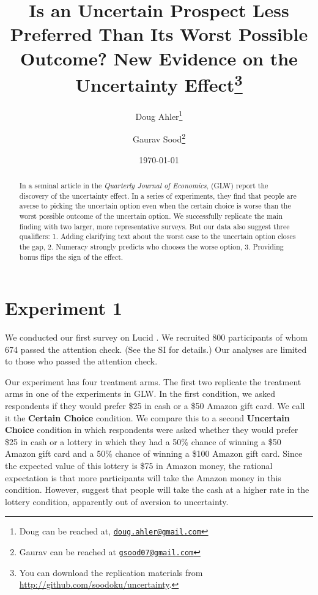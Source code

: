 \documentclass[12pt, letterpaper]{article}
\title{Is an Uncertain Prospect Less Preferred Than Its Worst Possible Outcome? New Evidence on the Uncertainty Effect\thanks{You can download the replication materials from \href{http://github.com/soodoku/uncertainty}{http://github.com/soodoku/uncertainty}.}}
\author{Doug Ahler\thanks{Doug can be reached at, \href{mailto:doug.ahler@gmail.com}{\footnotesize{\texttt{doug.ahler@gmail.com}}}} \and Gaurav Sood\thanks{Gaurav can be reached at \href{mailto:gsood07@gmail.com}{\footnotesize{\texttt{gsood07@gmail.com}}}}}
\date{\today}
\begin{document}
\maketitle

\thispagestyle{empty}
\begin{abstract}
\noindent In a seminal article in the \textit{Quarterly Journal of Economics}, \cite{gneezy2006uncertainty} (GLW) report the discovery of the uncertainty effect. In a series of experiments, they find that people are averse to picking the uncertain option even when the certain choice is worse than the worst possible outcome of the uncertain option. We successfully replicate the main finding with two larger, more representative surveys. But our data also suggest three qualifiers: 1. Adding clarifying text about the worst case to the uncertain option closes the gap, 2. Numeracy strongly predicts who chooses the worse option, 3. Providing bonus flips the sign of the effect.
\end{abstract} 
\clearpage
\setcounter{page}{1}
\doublespace

\section*{Experiment 1}

We conducted our first survey on Lucid \citep{coppock2019validating}. We recruited 800 participants of whom 674 passed the attention check. (See the SI for details.) Our analyses are limited to those who passed the attention check.

Our experiment has four treatment arms. The first two replicate the treatment arms in one of the experiments in GLW. In the first condition, we asked respondents if they would prefer \$25 in cash or a \$50 Amazon gift card. We call it the \textbf{Certain Choice} condition. We compare this to a second \textbf{Uncertain Choice} condition in which respondents were asked whether they would prefer \$25 in cash or a lottery in which they had a 50\% chance of winning a \$50 Amazon gift card and a 50\% chance of winning a \$100 Amazon gift card. Since the expected value of this lottery is \$75 in Amazon money, the rational expectation is that more participants will take the Amazon money in this condition. However, \cite{gneezy2006uncertainty} suggest that people will take the cash at a higher rate in the lottery condition, apparently out of aversion to uncertainty.
\end{document}
